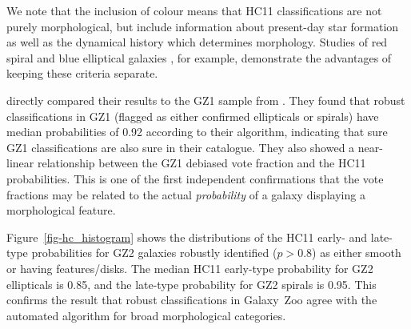 \documentclass[useAMS,usenatbib]{mn2e}
\begin{document}
We note that the inclusion of colour means that HC11 classifications are not purely morphological, but include information about present-day star formation as well as the dynamical history which determines morphology. Studies of red spiral \citep{mas10a} and blue elliptical galaxies \citep{sch09}, for example, demonstrate the advantages of keeping these criteria separate. 

\citet{hue11} directly compared their results to the GZ1 sample from \citet{lin11}. They found that robust classifications in GZ1 (flagged as either confirmed ellipticals or spirals) have median probabilities of 0.92 according to their algorithm, indicating that sure GZ1 classifications are also sure in their catalogue. They also showed a near-linear relationship between the GZ1 debiased vote fraction and the HC11 probabilities. This is one of the first independent confirmations that the vote fractions may be related to the actual {\em probability} of a galaxy displaying a morphological feature. 


Figure~\ref{fig-hc_histogram} shows the distributions of the HC11 early- and late-type probabilities for GZ2 galaxies robustly identified ($p>0.8$) as either smooth or having features/disks. The median HC11 early-type probability for GZ2 ellipticals is 0.85, and the late-type probability for GZ2 spirals is 0.95. This confirms the result that robust classifications in Galaxy~Zoo agree with the automated algorithm for broad morphological categories. 
\end{document}
